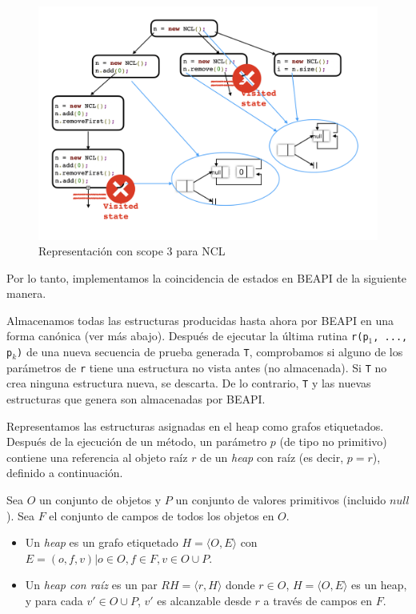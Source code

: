 \begin{figure}[H]
  \centering
  \includegraphics[width=1\textwidth]{images/stateMatching1.jpg}
  \caption{Representación con scope 3 para NCL}
  \label{fig:stateMatching}
\end{figure}

Por lo tanto, implementamos la coincidencia de estados en \textsf{BEAPI} de la siguiente manera.



Almacenamos todas las estructuras producidas hasta ahora por \textsf{BEAPI} en una forma canónica (ver más abajo). Después de ejecutar la última rutina \texttt{r(p$_1$, ..., p$_k$)} de una nueva secuencia de prueba generada \texttt{T}, comprobamos si alguno de los parámetros de \texttt{r} tiene una estructura no vista antes (no almacenada). Si \texttt{T} no crea ninguna estructura nueva, se descarta. De lo contrario, \texttt{T} y las nuevas estructuras que genera son almacenadas por \textsf{BEAPI}.

Representamos las estructuras asignadas en el heap como grafos etiquetados. Después de la ejecución de un método, un parámetro $p$ (de tipo no primitivo) contiene una referencia al objeto raíz $r$ de un \emph{heap} con raíz (es decir, $p=r$), definido a continuación.

\begin{definition}
Sea $O$ un conjunto de objetos y $P$ un conjunto de valores primitivos (incluido $null$). Sea $F$ el conjunto de campos de todos los objetos en $O$.
\begin{itemize}
\item Un \emph{heap} es un grafo etiquetado $H = \langle O, E\rangle$ con $E = {(o, f, v) | o \in O, f \in F, v \in O \cup P}$.
\item Un \emph{heap con raíz} es un par $RH = \langle r, H \rangle$ donde $r \in O$, $H = \langle O, E\rangle$ es un heap, y para cada $v' \in O \cup P$, $v'$ es alcanzable desde $r$ a través de campos en $F$.
\end{itemize}
\end{definition}

